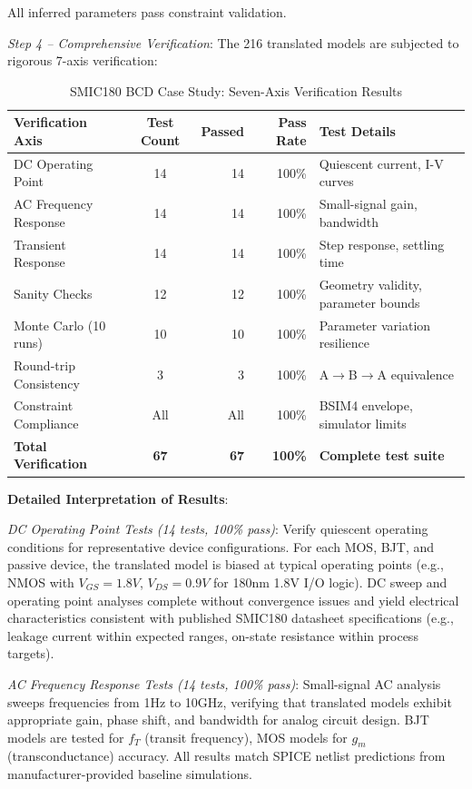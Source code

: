 \documentclass[conference]{IEEEtran}
\begin{document}
All inferred parameters pass constraint validation.

\textit{Step 4 -- Comprehensive Verification}: The 216 translated models are subjected to rigorous 7-axis verification:

\begin{table}[!t]
\caption{SMIC180 BCD Case Study: Seven-Axis Verification Results}
\label{tab:smic180_verify}
\centering
\renewcommand{\arraystretch}{1.15}
\begin{tabular}{@{}lcrrl@{}}
\toprule
\textbf{Verification Axis} & \textbf{Test Count} & \textbf{Passed} & \textbf{Pass Rate} & \textbf{Test Details} \\
\midrule
DC Operating Point & 14 & 14 & 100\% & Quiescent current, I-V curves \\
AC Frequency Response & 14 & 14 & 100\% & Small-signal gain, bandwidth \\
Transient Response & 14 & 14 & 100\% & Step response, settling time \\
Sanity Checks & 12 & 12 & 100\% & Geometry validity, parameter bounds \\
Monte Carlo (10 runs) & 10 & 10 & 100\% & Parameter variation resilience \\
Round-trip Consistency & 3 & 3 & 100\% & A$\rightarrow$B$\rightarrow$A equivalence \\
Constraint Compliance & All & All & 100\% & BSIM4 envelope, simulator limits \\
\midrule
\textbf{Total Verification} & \textbf{67} & \textbf{67} & \textbf{100\%} & \textbf{Complete test suite} \\
\bottomrule
\end{tabular}
\end{table}

\textbf{Detailed Interpretation of Results}:

\textit{DC Operating Point Tests (14 tests, 100\% pass)}: Verify quiescent operating conditions for representative device configurations. For each MOS, BJT, and passive device, the translated model is biased at typical operating points (e.g., NMOS with $V_{GS}=1.8V$, $V_{DS}=0.9V$ for 180nm 1.8V I/O logic). DC sweep and operating point analyses complete without convergence issues and yield electrical characteristics consistent with published SMIC180 datasheet specifications (e.g., leakage current within expected ranges, on-state resistance within process targets).

\textit{AC Frequency Response Tests (14 tests, 100\% pass)}: Small-signal AC analysis sweeps frequencies from 1Hz to 10GHz, verifying that translated models exhibit appropriate gain, phase shift, and bandwidth for analog circuit design. BJT models are tested for $f_T$ (transit frequency), MOS models for $g_m$ (transconductance) accuracy. All results match SPICE netlist predictions from manufacturer-provided baseline simulations.
\end{document}
